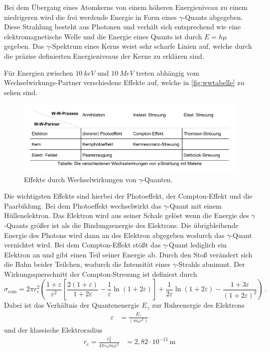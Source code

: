 Bei dem Übergang eines Atomkerns von einem höheren Energieniveau zu einem niedrigeren
wird die frei werdende Energie in Form eines $\gamma$-Quants abgegeben. 
Diese Strahlung besteht aus Photonen und verhält sich entsprechend wie eine elektromagnetische Welle 
und die Energie eines Quants ist durch $E = h \mu$ gegeben. 
Das $\gamma$-Spektrum eines Kerns weist sehr scharfe Linien auf,
welche durch die präzise definierten Energieniveaus der Kerne zu erklären sind.

Für Energien zwischen $\qty{10}{keV}$ und $\qty{10}{MeV}$ treten abhängig vom Wechselwirkungs-Partner
verschiedene Effekte auf, welche in \autoref{fig:wwtabelle} zu sehen sind.
\begin{figure}
    \centering
    \includegraphics[width=\linewidth]{pictures/wwtabelle.pdf}
    \caption{Effekte durch Wechselwirkungen von $\gamma$-Quanten. \cite{v704}}
    \label{fig:wwtabelle}
\end{figure}

Die wichtigsten Effekte sind hierbei der Photoeffekt, der Compton-Effekt und die Paarbildung. 
Bei dem Photoeffekt wechselwirkt das $\gamma$-Quant mit einem Hüllenelektron. 
Das Elektron wird aus seiner Schale gelöst wenn die Energie des $\gamma$-Quants größer ist als die Bindungsenergie des Elektrons. 
Die übrigbleibende Energie des Photons wird dann an des Elektron abgegeben wodurch das $\gamma$-Quant vernichtet wird. 
Bei dem Compton-Effekt stößt das $\gamma$-Quant lediglich ein Elektron an und gibt einen Teil seiner Energie ab. 
Durch den Stoß verändert sich die Bahn beider Teilchen, wodurch die Intensität eines $\gamma$-Strahls abnimmt. 
Der Wirkungsquerschnitt der Compton-Streuung ist definiert durch
\begin{equation}
    \sigma_{\text{com}} = 
    2 \pi r_{e}^{2} 
    \left(
        \frac{1+\varepsilon}{\varepsilon^{2}} 
        \left[
              \frac{2(1+\varepsilon)}{1+2 \varepsilon}-\frac{1}{\varepsilon} \ln (1+2 \varepsilon) 
        \right] 
        +\frac{1}{2 \varepsilon} \ln (1+2 \varepsilon)-\frac{1+3 \varepsilon}{(1+2 \varepsilon)^{2}}
    \right) \, .
\end{equation}
Dabei ist das Verhältnis der Quantenenergie $E_\gamma$ zur Ruheenergie des Elektrons 
\begin{align*}
    \varepsilon &= \frac{E_\gamma}{(m_0 c^2)} 
\end{align*}
und der klassische Elektroradius
\begin{align*}
    r_{e} = \frac{e_{0}^{2}}{4 \pi \varepsilon_{0} m_{0} c^{2}} &= 2,82 \cdot 10^{-15} \mathrm{~m}
\end{align*}

